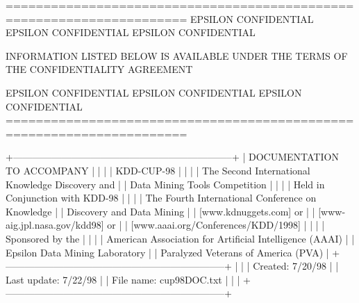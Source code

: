 \documentclass[
  11pt,
  a4paper,
  DIV=12,captions=tableheading,oneside,titlepage]{scrbook}
\let\oldverbatim\verbatim
\let\endoldverbatim\endverbatim
\renewenvironment{verbatim}{\footnotesize\oldverbatim}{\endoldverbatim}
\begin{document}
\begin{verbatim}
======================================================================
EPSILON CONFIDENTIAL      EPSILON CONFIDENTIAL    EPSILON CONFIDENTIAL

    INFORMATION LISTED BELOW IS AVAILABLE UNDER THE TERMS OF THE  
                      CONFIDENTIALITY AGREEMENT                

EPSILON CONFIDENTIAL      EPSILON CONFIDENTIAL    EPSILON CONFIDENTIAL
======================================================================

+--------------------------------------------------------------------+
|                   DOCUMENTATION TO ACCOMPANY                       |
|                                                                    |
|                          KDD-CUP-98                                |
|                                                                    |
|          The Second International Knowledge Discovery and          |
|                 Data Mining Tools Competition                      |
|                                                                    |
|                Held in Conjunction with KDD-98                     |
|                                                                    |
|          The Fourth International Conference on Knowledge          |
|                   Discovery and Data Mining                        |
|                    [www.kdnuggets.com] or                          |
|                 [www-aig.jpl.nasa.gov/kdd98] or                    |
|                [www.aaai.org/Conferences/KDD/1998]                 |
|                                                                    |
|                       Sponsored by the                             |
|                                                                    |
|      American Association for Artificial Intelligence (AAAI)       |
|                  Epsilon Data Mining Laboratory                    |
|                Paralyzed Veterans of America (PVA)                 |
+--------------------------------------------------------------------+
|                                                                    |
| Created:     7/20/98                                               |
| Last update: 7/22/98                                               |
| File name:   cup98DOC.txt                                          |
|                                                                    |
+--------------------------------------------------------------------+


\end{verbatim}
\end{document}
